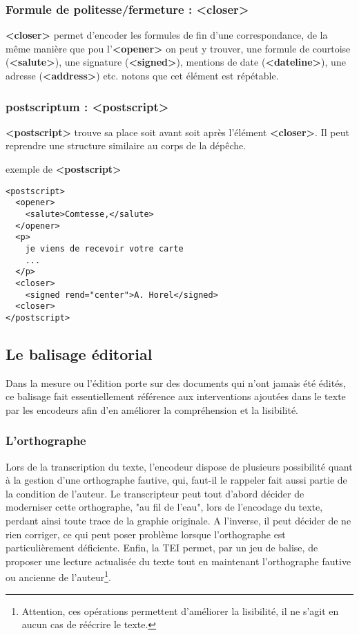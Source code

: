 \documentclass[18pt,a4paper,oneside]{book} %
\begin{document}
\subsubsection{Formule de politesse/fermeture : <closer>}

\textbf{<closer>} permet d'encoder les formules de fin d'une correspondance, de la même manière que pou l'\textbf{<opener>} on peut y trouver, une formule de courtoise (\textbf{<salute>}), une signature (\textbf{<signed>}), mentions de date (\textbf{<dateline>}), une adresse (\textbf{<address>}) etc.
\bigskip 
 notons que cet élément est répétable. 

\subsubsection{postscriptum : <postscript>}

\textbf{<postscript>} trouve sa place soit avant soit après l'élément \textbf{<closer>}. Il peut reprendre une structure similaire au corps de la dépêche.
\bigskip 

exemple de \textbf{<postscript>}
\begin{lstlisting}
<postscript>
  <opener>
    <salute>Comtesse,</salute>    
  </opener>
  <p>
    je viens de recevoir votre carte
    ...  
  </p>
  <closer>
    <signed rend="center">A. Horel</signed>
  <closer>
</postscript>
\end{lstlisting}

\subsection{Le balisage éditorial}
Dans la mesure ou l'édition porte sur des documents qui n'ont jamais été édités, ce balisage fait essentiellement référence aux interventions ajoutées dans le texte par les encodeurs afin d'en améliorer la compréhension et la lisibilité. 

\subsubsection{L'orthographe}

Lors de la transcription du texte, l'encodeur dispose de plusieurs possibilité quant à la gestion d'une orthographe fautive, qui, faut-il le rappeler fait aussi partie de la condition de l'auteur. Le transcripteur peut tout d'abord décider de moderniser cette orthographe, "au fil de l'eau", lors de l'encodage du texte, perdant ainsi toute trace de la graphie originale. A l'inverse, il peut décider de ne rien corriger, ce qui peut poser problème lorsque l'orthographe est particulièrement déficiente. Enfin, la TEI permet, par un jeu de balise, de proposer une lecture actualisée du texte tout en maintenant l'orthographe fautive ou ancienne de l'auteur\footnote{Attention, ces opérations permettent d'améliorer la lisibilité, il ne s'agit en aucun cas de réécrire le texte.}.
\bigskip 
\end{document}
